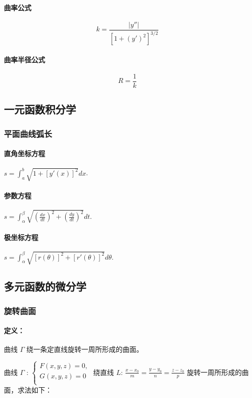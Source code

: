 ﻿\documentclass[a4paper,12pt,UTF8]{ctexart}
\begin{document}
    \paragraph{曲率公式}
    \[k=\frac{|y''|}{[1+(y')^2]^{3/2}}\]
    \paragraph{曲率半径公式}
    \[R=\frac{1}{k}\]

    \subsection{一元函数积分学}

    \subsubsection{平面曲线弧长}

    \paragraph{直角坐标方程} \(s=\int_{a}^{b} \sqrt{1+[y'(x)]^2}dx \). 
    \paragraph{参数方程} \(s=\int_{\alpha}^{\beta} \sqrt{\left(\frac{dx}{dt}\right)^2+\left(\frac{dy}{dt}\right)^2}dt \).
    \paragraph{极坐标方程} \(s=\int_{\alpha}^{\beta} \sqrt{[r(\theta)]^2+[r'(\theta)]^2}d\theta \).
    
    \subsection{多元函数的微分学}

    \subsubsection{旋转曲面}
    \paragraph{定义：} 曲线 \(\varGamma\) 绕一条定直线旋转一周所形成的曲面。
    
    曲线 \(\varGamma\) : 
    \(\begin{cases}
        F(x,y,z)=0,\\
        G(x,y,z)=0\\
    \end{cases} \)
    绕直线 \(L\): \(\frac{x-x_0}{m}=\frac{y-y_0}{n}=\frac{z-z_0}{p}\) 旋转一周所形成的曲面，求法如下：
\end{document}
